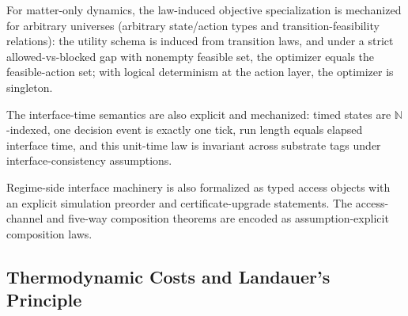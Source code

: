 For matter-only dynamics, the law-induced objective specialization is mechanized for arbitrary universes (arbitrary state/action types and transition-feasibility relations): the utility schema is induced from transition laws, and under a strict allowed-vs-blocked gap with nonempty feasible set, the optimizer equals the feasible-action set; with logical determinism at the action layer, the optimizer is singleton.

The interface-time semantics are also explicit and mechanized: timed states are $\mathbb{N}$-indexed, one decision event is exactly one tick, run length equals elapsed interface time, and this unit-time law is invariant across substrate tags under interface-consistency assumptions.

Regime-side interface machinery is also formalized as typed access objects with an explicit simulation preorder and certificate-upgrade statements. The access-channel and five-way composition theorems are encoded as assumption-explicit composition laws.

\subsection{Thermodynamic Costs and Landauer's Principle}

